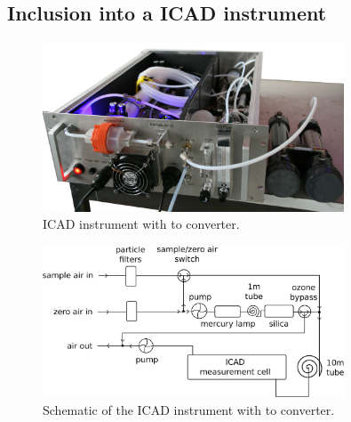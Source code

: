 \subsection{Inclusion into a ICAD instrument}
\label{sec:inclusion}

\begin{figure}[htbp]
  \centering
  \includegraphics[width=0.8\textwidth]{images/InstrumentEdited_small.jpg}
  \caption{ICAD instrument with  to 
    converter.}
  \label{fig:envimes}
\end{figure}

\begin{figure}[htbp]
  \centering
  \includegraphics[width=0.8\textwidth]{images/envimes_setup.eps}
  \caption{Schematic of the  ICAD instrument with  to
     converter.}
  \label{fig:envimes-schematic}
\end{figure}

